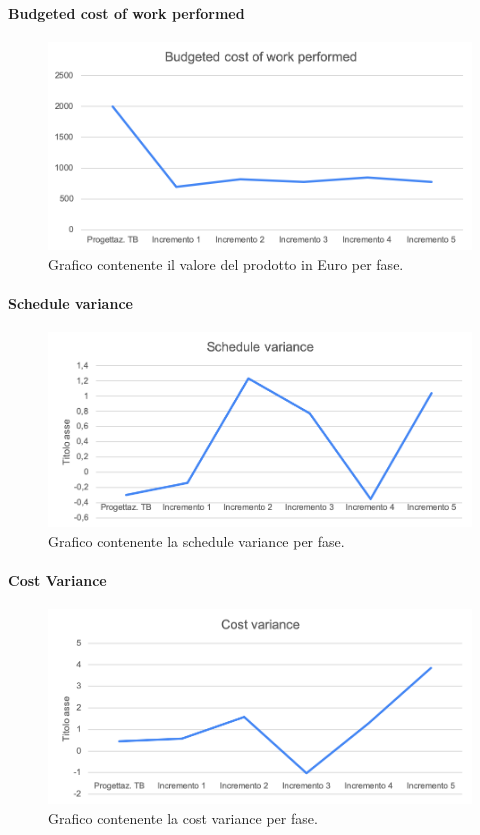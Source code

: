 	\paragraph{Budgeted cost of work performed}
		\begin{figure}[H]
			\centering
			\includegraphics[width=0.8\linewidth]{./res/images/BCWP_1.png}
			\caption{Grafico contenente il valore del prodotto in Euro per fase.}
			\label{fig:Grafico contenente il valore del prodotto in Euro per fase.}
		\end{figure}

	\paragraph{Schedule variance}
		\begin{figure}[H]
			\centering
			\includegraphics[width=0.8\linewidth]{./res/images/SV_1.png}
			\caption{Grafico contenente la schedule variance per fase.}
			\label{fig:Grafico contenente la schedule variance per fase.}
		\end{figure}

	\paragraph{Cost Variance}
		\begin{figure}[H]
			\centering
			\includegraphics[width=0.8\linewidth]{./res/images/CV_1.png}
			\caption{Grafico contenente la cost variance per fase.}
			\label{fig:Grafico contenente la cost variance per fase.}
		\end{figure}

